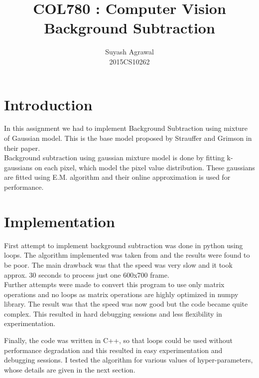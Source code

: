 \documentclass[12pt]{article}
\title{COL780 : Computer Vision\\Background Subtraction}
\author{Suyash Agrawal\\2015CS10262}
\begin{document}
\maketitle
\section{Introduction}
In this assignment we had to implement Background Subtraction using mixture of Gaussian model.
This is the base model proposed by Strauffer and Grimson in their paper.\\
Background subtraction using gaussian mixture model is done by fitting k-gaussians on each pixel,
which model the pixel value distribution. These gaussians are fitted using E.M. algorithm and their
online approximation is used for performance.

\section{Implementation}
First attempt to implement background subtraction was done in python using loops. The algorithm implemented
was taken from \cite{hal} and the results were found to be poor. The main drawback was that the speed was very
slow and it took approx. 30 seconds to process just one 600x700 frame.\\
Further attempts were made to convert this program to use only matrix operations and no loops as matrix operations
are highly optimized in numpy library. The result was that the speed was now good but the code became quite complex.
This resulted in hard debugging sessions and less flexibility in experimentation.

Finally, the code was written in C++, so that loops could be used without performance degradation and this resulted
in easy experimentation and debugging sessions. I tested the algorithm for various values of hyper-parameters, whose
details are given in the next section.
\end{document}
